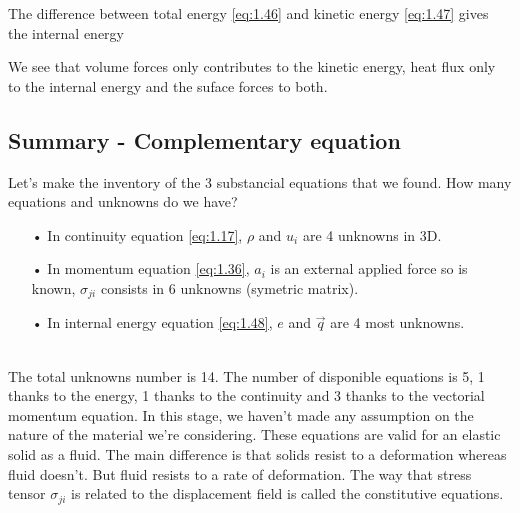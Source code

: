 		\begin{center}
		\end{center}
		The difference between total energy \eqref{eq:1.46} and kinetic energy \eqref{eq:1.47} gives the internal energy
		
		\begin{center}
		\end{center}
		We see that volume forces only contributes to the kinetic energy, heat flux only to the internal energy and the suface forces to both. 
		
	\subsection{Summary - Complementary equation}
		Let's make the inventory of the 3 substancial equations that we found. How many equations and unknowns do we have? 
	\begin{itemize}
		\item[•] In continuity equation \eqref{eq:1.17}, $\rho$ and $u_i$ are 4 unknowns in 3D. 
		\item[•] In momentum equation \eqref{eq:1.36}, $a_i$ is an external applied force so is known, $\sigma _{ji}$ consists in 6 unknowns (symetric matrix).
		\item[•] In internal energy equation \eqref{eq:1.48}, $e$ and $\vec{q}$ are 4 most unknowns. 
	\end{itemize}			
	\ \\
	The total unknowns number is 14.  The number of disponible equations is 5, 1 thanks to the energy, 1 thanks to the continuity and 3 thanks to the vectorial momentum equation. In this stage, we haven't made any assumption on the nature of the material we're considering. These equations are valid for an elastic solid as a fluid. The main difference is that solids resist to a deformation whereas fluid doesn't. But fluid resists to a rate of deformation. The way that stress tensor $\sigma _{ji}$ is related to the displacement field is called the constitutive equations. 
	
